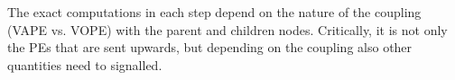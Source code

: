 \vspace{1cm}
\noindent
The exact computations in each step depend on the nature of the coupling (\textsf{VAPE} vs. \textsf{VOPE}) with the parent and children nodes. Critically, it is not only the PEs that are sent upwards, but depending on the coupling also other quantities need to signalled.

